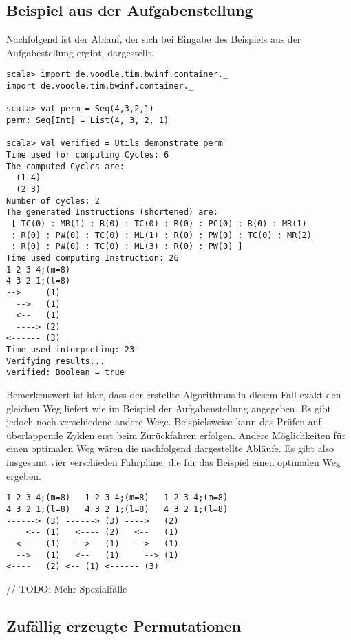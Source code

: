 \subsection{Beispiel aus der Aufgabenstellung}
Nachfolgend ist der Ablauf, der sich bei Eingabe des Beispiels aus der Aufgabestellung ergibt, dargestellt.
\begin{lstlisting}
scala> import de.voodle.tim.bwinf.container._
import de.voodle.tim.bwinf.container._

scala> val perm = Seq(4,3,2,1)               
perm: Seq[Int] = List(4, 3, 2, 1)

scala> val verified = Utils demonstrate perm 
Time used for computing Cycles: 6
The computed Cycles are: 
  (1 4)
  (2 3)
Number of cycles: 2
The generated Instructions (shortened) are: 
 [ TC(0) : MR(1) : R(0) : TC(0) : R(0) : PC(0) : R(0) : MR(1)
 : R(0) : PW(0) : TC(0) : ML(1) : R(0) : PW(0) : TC(0) : MR(2)
 : R(0) : PW(0) : TC(0) : ML(3) : R(0) : PW(0) ] 
Time used computing Instruction: 26
1 2 3 4;(m=8)
4 3 2 1;(l=8)
-->     (1)
  -->   (1)
  <--   (1)
  ----> (2)
<------ (3)
Time used interpreting: 23
Verifying results...
verified: Boolean = true
\end{lstlisting}
Bemerkenswert ist hier, dass der erstellte Algorithmus in diesem Fall exakt den gleichen Weg liefert wie im Beispiel der Aufgabenstellung angegeben.
Es gibt jedoch noch verschiedene andere Wege.
Beispielsweise kann das Prüfen auf überlappende Zyklen erst beim Zurückfahren erfolgen.
Andere Möglichkeiten für einen optimalen Weg wären die nachfolgend dargestellte Abläufe.
Es gibt also insgesamt vier verschieden Fahrpläne, die für das Beispiel einen optimalen Weg ergeben.
\begin{lstlisting}                   
1 2 3 4;(m=8)	1 2 3 4;(m=8)	1 2 3 4;(m=8)
4 3 2 1;(l=8)	4 3 2 1;(l=8)	4 3 2 1;(l=8)
------>	(3)	------>	(3)	---->	(2)
    <--	(1)	  <----	(2)	  <--	(1)
  <--	(1)	  -->	(1)	  -->	(1)
  -->	(1)	  <--	(1)	    -->	(1)
<----	(2)	<--	(1)	<------	(3)
\end{lstlisting}
// TODO: Mehr Spezialfälle
\clearpage
\subsection{Zufällig erzeugte Permutationen}

